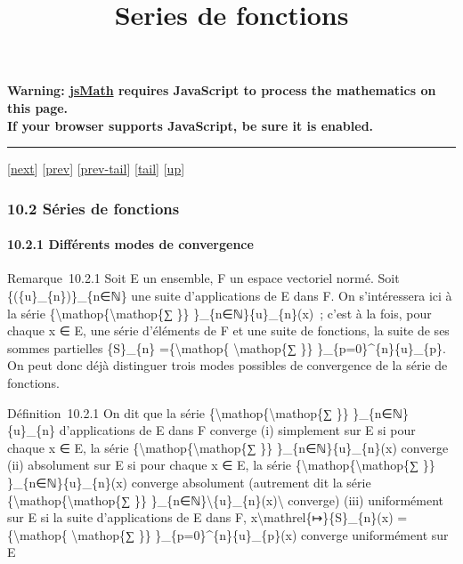 \documentclass[]{article}
\title{Series de fonctions}
\author{}
\date{}
\begin{document}
\maketitle

\textbf{Warning: \href{http://www.math.union.edu/locate/jsMath}{jsMath}
requires JavaScript to process the mathematics on this page.\\ If your
browser supports JavaScript, be sure it is enabled.}

\begin{center}\rule{3in}{0.4pt}\end{center}

{[}\href{coursse62.html}{next}{]} {[}\href{coursse60.html}{prev}{]}
{[}\href{coursse60.html\#tailcoursse60.html}{prev-tail}{]}
{[}\hyperref[tailcoursse61.html]{tail}{]}
{[}\href{coursch11.html\#coursse61.html}{up}{]}

\subsubsection{10.2 Séries de fonctions}

\paragraph{10.2.1 Différents modes de convergence}

Remarque~10.2.1 Soit E un ensemble, F un espace vectoriel normé. Soit
\{(\{u\}\_\{n\})\}\_\{n∈ℕ\} une suite d'applications de E dans F. On
s'intéressera ici à la série
\{\textbackslash{}mathop\{\textbackslash{}mathop\{∑ \}\}
\}\_\{n∈ℕ\}\{u\}\_\{n\}(x)~; c'est à la fois, pour chaque x ∈ E, une
série d'éléments de F et une suite de fonctions, la suite de ses sommes
partielles \{S\}\_\{n\} =\{\textbackslash{}mathop\{
\textbackslash{}mathop\{∑ \}\} \}\_\{p=0\}\^{}\{n\}\{u\}\_\{p\}. On peut
donc déjà distinguer trois modes possibles de convergence de la série de
fonctions.

Définition~10.2.1 On dit que la série
\{\textbackslash{}mathop\{\textbackslash{}mathop\{∑ \}\}
\}\_\{n∈ℕ\}\{u\}\_\{n\} d'applications de E dans F converge (i)
simplement sur E si pour chaque x ∈ E, la série
\{\textbackslash{}mathop\{\textbackslash{}mathop\{∑ \}\}
\}\_\{n∈ℕ\}\{u\}\_\{n\}(x) converge (ii) absolument sur E si pour chaque
x ∈ E, la série \{\textbackslash{}mathop\{\textbackslash{}mathop\{∑ \}\}
\}\_\{n∈ℕ\}\{u\}\_\{n\}(x) converge absolument (autrement dit la série
\{\textbackslash{}mathop\{\textbackslash{}mathop\{∑ \}\}
\}\_\{n∈ℕ\}\textbackslash{}\textbar{}\{u\}\_\{n\}(x)\textbackslash{}\textbar{}
converge) (iii) uniformément sur E si la suite d'applications de E dans
F, x\textbackslash{}mathrel\{↦\}\{S\}\_\{n\}(x)
=\{\textbackslash{}mathop\{ \textbackslash{}mathop\{∑ \}\}
\}\_\{p=0\}\^{}\{n\}\{u\}\_\{p\}(x) converge uniformément sur E
\end{document}
